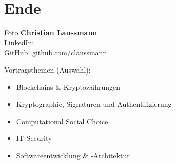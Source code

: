 
\section{Ende}

\begin{frame}{}
    Foto
    \textbf{Christian Laussmann}\\
    LinkedIn:\\
    GitHub: \href{https://github.com/claussmann}{\textcolor{secondarycolor}{github.com/claussmann}}

    \vspace{1cm}
    Vortragsthemen (Auswahl):
    \begin{itemize}
        \item Blockchains \& Kryptowährungen
        \item Kryptographie, Signaturen und Authentifizierung
        \item Computational Social Choice
        \item IT-Security
        \item Softwareentwicklung \& -Architektur
    \end{itemize}
\end{frame}